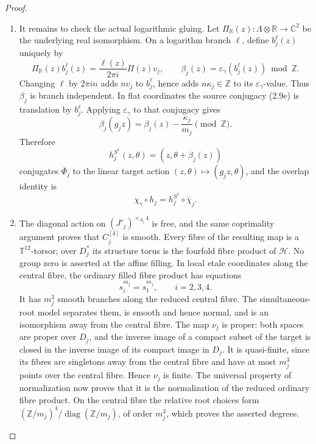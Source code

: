 \begin{proof}
\begin{enumerate}[label=\arabic*.,leftmargin=*]
\item It remains to check the actual logarithmic gluing.  Let
\(\Pi_{\mathbb R}(z):\Lambda\otimes\mathbb R\to\mathbb C^2\) be the
underlying real isomorphism.  On a logarithm branch \(\ell\), define
\(b_j^\ell(z)\) uniquely by
\begin{equation}
 \Pi_{\mathbb R}(z)b_j^\ell(z)
 =\frac{\ell(z)}{2\pi i}\Pi(z)v_j,\qquad
 \beta_j(z)=\varepsilon_\gamma(b_j^\ell(z))\bmod\mathbb Z.
 \label{wb:cusp-spec-finite-target-conjugacy}
\end{equation}
Changing \(\ell\) by \(2\pi in\) adds \(nv_j\) to \(b_j^\ell\), hence
adds \(n\kappa_j\in\mathbb Z\) to its
\(\varepsilon_\gamma\)-value.  Thus \(\beta_j\) is branch independent.
In flat coordinates the source conjugacy (2.9e) is translation by
\(b_j^\ell\).  Applying \(\varepsilon_\gamma\) to that conjugacy gives
\begin{equation}
 \beta_j(g_jz)=\beta_j(z)-\frac{\kappa_j}{m_j}\pmod{\mathbb Z}.
 \label{wb:cusp-spec-finite-target-cocycle}
\end{equation}
Therefore
\[
 h_j^{S^1}(z,\theta)=(z,\theta+\beta_j(z))
\]
conjugates \(\overline\Phi_j\) to the linear target action
\((z,\theta)\mapsto(g_jz,\theta)\), and the overlap identity is
\begin{equation}
 \chi_\gamma\circ h_j=h_j^{S^1}\circ\overline\chi_j.
 \label{wb:cusp-spec-finite-overlap-identity}
\end{equation}

\item The diagonal action on
\((J'_j)^{\times_{\Delta_j}4}\) is free, and the same coprimality argument
proves that \(C_j^{[4]}\) is smooth.  Every fibre of the resulting map is
a \(\mathbb T^{12}\)-torsor; over \(D_j^*\) its structure torus is the
fourfold fibre product of \(\mathcal H\).  No group zero is asserted at
the affine filling.
In local etale coordinates along the central fibre, the ordinary filled
fibre product has equations
\begin{equation}
 s_i^{m_j}=s_1^{m_j},\qquad i=2,3,4.
 \label{wb:cusp-spec-finite-fibre-product-branches}
\end{equation}
It has \(m_j^3\) smooth branches along the reduced central fibre.  The
simultaneous-root model separates them, is smooth and hence normal, and is
an isomorphism away from the central fibre.  The map \(\nu_j\) is proper:
both spaces are proper over \(D_j\), and the inverse image of a compact
subset of the target is closed in the inverse image of its compact image
in \(D_j\).  It is quasi-finite, since its fibres are singletons away from
the central fibre and have at most \(m_j^3\) points over the central
fibre.  Hence \(\nu_j\) is finite.  The universal property of
normalization now proves that it is the normalization of the reduced
ordinary fibre product.  On the central fibre the relative root choices form
\((\mathbb Z/m_j)^4/\operatorname{diag}(\mathbb Z/m_j)\), of order
\(m_j^3\), which proves the asserted degrees.


\end{enumerate}
\end{proof}
